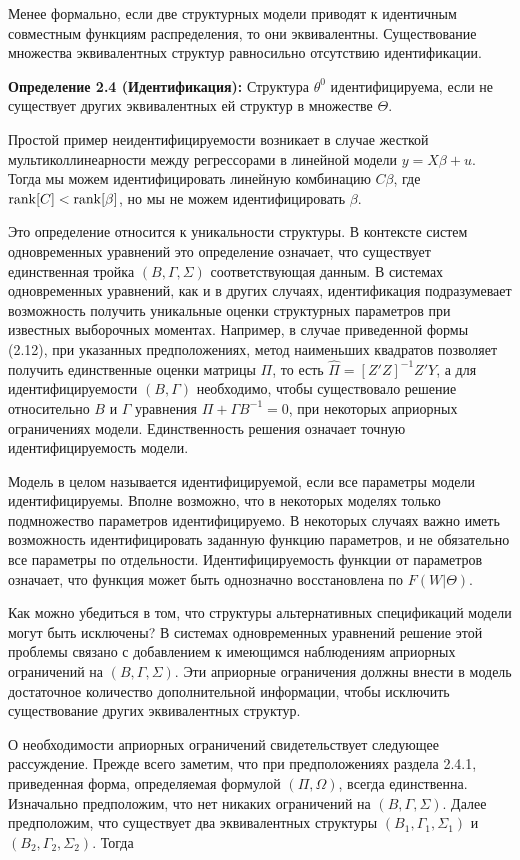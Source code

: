 Менее формально,  если две структурных  модели приводят к идентичным  совместным функциям   распределения, то они эквивалентны. Существование множества  эквивалентных структур равносильно отсутствию идентификации.

{\bf Определение 2.4 (Идентификация):} Структура $\theta^{0}$ идентифицируема, если не существует других эквивалентных ей структур в множестве $\Theta$.


Простой пример неидентифицируемости  возникает в случае жесткой мультиколлинеарности между регрессорами в линейной модели $y=X\beta+u$. Тогда мы можем идентифицировать линейную комбинацию $C\beta$, где $\mathrm{rank}[C] < \mathrm{rank}[\beta]$, но мы не можем идентифицировать $\beta$.


Это определение относится к уникальности структуры. В контексте систем одновременных уравнений  это определение означает, что существует единственная тройка $(B,\Gamma,\Sigma)$ соответствующая данным. 
В системах одновременных уравнений, как и в других случаях, идентификация подразумевает возможность получить уникальные оценки структурных параметров при известных выборочных моментах. Например, в случае приведенной формы (2.12), при указанных предположениях, метод наименьших квадратов позволяет получить единственные оценки матрицы $\Pi$, то есть $\hat{\Pi}=[Z'Z]^{-1}Z'Y$, а для идентифицируемости  $(B,\Gamma)$ необходимо, чтобы существовало решение относительно $B$ и $\Gamma$  уравнения $\Pi+\Gamma B^{-1}=0$, при некоторых  априорных ограничениях  модели. 
Единственность решения означает точную  идентифицируемость модели.

Модель в целом называется идентифицируемой,  если все параметры модели идентифицируемы. Вполне возможно, что в некоторых моделях только подмножество параметров идентифицируемо. В некоторых случаях важно иметь возможность идентифицировать заданную функцию параметров, и не обязательно все  параметры по отдельности. Идентифицируемость функции от параметров означает, что функция может быть однозначно восстановлена по $F(W|\Theta)$.


Как можно убедиться в том, что структуры альтернативных спецификаций модели могут быть исключены? В системах одновременных уравнений решение этой проблемы связано с добавлением к имеющимся наблюдениям априорных ограничений на $(B,\Gamma,\Sigma)$. Эти априорные ограничения должны внести в модель достаточное количество дополнительной информации, чтобы исключить существование других эквивалентных структур.
	
	
О необходимости априорных ограничений свидетельствует следующее рассуждение. Прежде всего заметим, что при предположениях раздела 2.4.1, приведенная форма, определяемая формулой $(\Pi,\Omega)$, всегда единственна. Изначально предположим, что нет никаких ограничений на $(B,\Gamma,\Sigma)$. Далее предположим, что существует два эквивалентных структуры $(B_{1},\Gamma_{1},\Sigma_{1})$ и $(B_{2},\Gamma_{2},\Sigma_{2})$. Тогда
	
